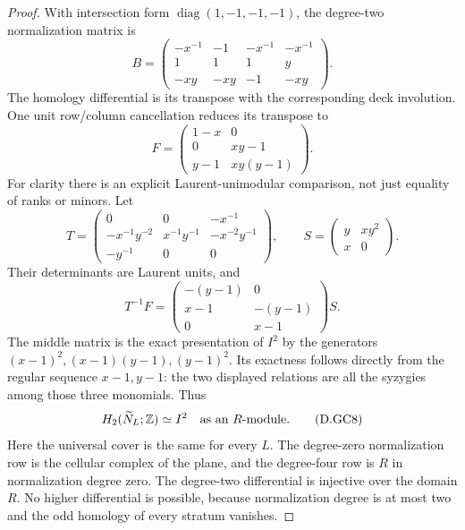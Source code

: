 \begin{proof}
With intersection form $\operatorname{diag}(1,-1,-1,-1)$,
the degree-two normalization matrix is
\[
 B=\begin{pmatrix}
 -x^{-1}&-1&-x^{-1}&-x^{-1}\\
 1&1&1&y\\
 -xy&-xy&-1&-xy
 \end{pmatrix}.                                         \tag{D.GC5}
\]
The homology differential is its transpose with
the corresponding deck involution. One unit
row/column cancellation reduces its transpose to
\[
 F=\begin{pmatrix}
 1-x&0\\0&xy-1\\y-1&xy(y-1)
 \end{pmatrix}.                                         \tag{D.GC6}
\]
For clarity there is an explicit Laurent-unimodular
comparison, not just equality of ranks or minors.
Let
\[
 T=\begin{pmatrix}
 0&0&-x^{-1}\\
 -x^{-1}y^{-2}&x^{-1}y^{-1}&-x^{-2}y^{-1}\\
 -y^{-1}&0&0
 \end{pmatrix},\qquad
 S=\begin{pmatrix}y&xy^2\\x&0\end{pmatrix}.
\]
Their determinants are Laurent units, and
\[
 T^{-1}F=
 \begin{pmatrix}-(y-1)&0\\x-1&-(y-1)\\0&x-1\end{pmatrix}S.
                                                        \tag{D.GC7}
\]
The middle matrix is the exact presentation
of $I^2$ by the generators
$(x-1)^2,(x-1)(y-1),(y-1)^2$.
Its exactness follows directly from the regular
sequence $x-1,y-1$: the two displayed relations
are all the syzygies among those three monomials.
Thus
\[
                H_2(\widetilde N_L;\mathbb Z)\simeq I^2
                         \quad\hbox{as an }R\hbox{-module}.
                                                        \tag{D.GC8}
\]
Here the universal cover is the same for every $L$.
The degree-zero normalization row is the cellular
complex of the plane, and the degree-four row is
$R$ in normalization degree zero. The degree-two
differential is injective over the domain $R$.
No higher differential is possible, because
normalization degree is at most two and the odd
homology of every stratum vanishes.


\end{proof}

